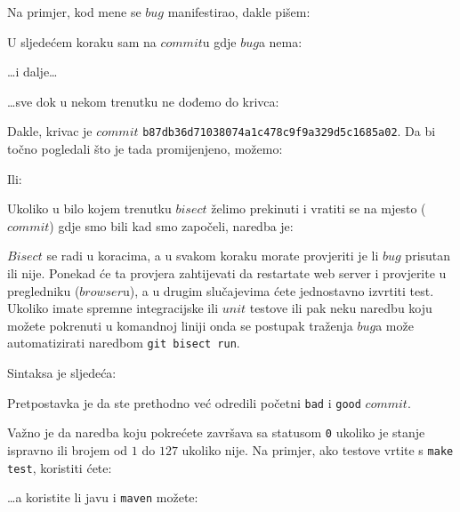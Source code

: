 Na primjer, kod mene se $bug$ manifestirao, dakle pišem:



U sljedećem koraku sam na $commit$u gdje $bug$a nema:



\dots{}i dalje\dots



\dots{}sve dok u nekom trenutku ne dođemo do krivca:



Dakle, krivac je $commit$ \verb+b87db36d71038074a1c478c9f9a329d5c1685a02+.
Da bi točno pogledali što je tada promijenjeno, možemo:


Ili:


Ukoliko u bilo kojem trenutku $bisect$ želimo prekinuti i vratiti se na mjesto ($commit$) gdje smo bili kad smo započeli, naredba je:



$Bisect$ se radi u koracima, a u svakom koraku morate provjeriti je li $bug$ prisutan ili nije.
Ponekad će ta provjera zahtijevati da restartate web server i provjerite u pregledniku ($browser$u), a u drugim slučajevima ćete jednostavno izvrtiti test.
Ukoliko imate spremne integracijske ili $unit$ testove ili pak neku naredbu koju možete pokrenuti u komandnoj liniji onda se postupak traženja $bug$a može automatizirati naredbom \verb+git bisect run+.

Sintaksa je sljedeća:


Pretpostavka je da ste prethodno već odredili početni \verb+bad+ i \verb+good+ $commit$.

Važno je da naredba koju pokrećete završava sa statusom \verb+0+ ukoliko je stanje ispravno ili brojem od $1$ do $127$ ukoliko nije.
Na primjer, ako testove vrtite s \verb+make test+, koristiti ćete: 


\dots{}a koristite li javu i \verb+maven+ možete:


